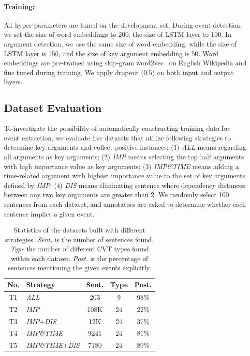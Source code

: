 \paragraph{Training:} All hyper-parameters are tuned on the development set. During event detection, we set the size of word embeddings to 200, the size of LSTM layer to 100. In argument detection, we use the same size of word embedding, while the size of LSTM layer is 150, and the size of key argument embedding is 50. Word embeddings are pre-trained using skip-gram word2vec~\cite{mikolov2013distributed} on English Wikipedia and fine tuned during training. We apply dropout (0.5) on both input and output layers.

\subsection{Dataset Evaluation}\label{sec:evalhypo}
To investigate the possibility of automatically constructing training data for event extraction, we evaluate five datasets that utilize  following strategies to determine key arguments and collect positive instances: (1) \emph{ALL} means regarding all arguments as key arguments; (2) \emph{IMP} means selecting the top half arguments with high importance value as key arguments; (3) \emph{IMP\&TIME} means adding a time-related argument with highest importance value to the set of key arguments defined by \emph{IMP}; (4) \emph{DIS} means eliminating sentence where dependency distances between any two key arguments are greater than 2. We randomly select 100 sentences from each dataset, and annotators are asked to determine whether each sentence implies a given event.

\begin{table}[h]
\small
\centering
\begin{tabular}{|c|l|c|c|c|} \hline
	No. & Strategy & Sent. & Type & Post. \\ \hline
	T1 & \emph{ALL} & 203 & 9 & 98\% \\ \hline
	T2 & \emph{IMP} & 108K & 24 & 22\% \\ \hline
	T3 & \emph{IMP}+\emph{DIS} & 12K & 24 & 37\% \\ \hline
	T4 & \emph{IMP\&TIME} & 9241 & 24 & 81\% \\ \hline
	T5 & \emph{IMP\&TIME}+\emph{DIS} & 7180 & 24 & 89\% \\ \hline
\end{tabular}
\caption{Statistics of the datasets built with different strategies. 
\textit{Sent.} is the number of sentences found. \textit{Type} the number of different CVT types found within each dataset.  \textit{Post.} is the percentage of sentences mentioning the given events explicitly. \label{tab:3}}
\end{table}

